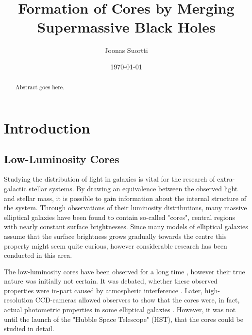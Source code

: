 \documentclass[english, twoside]{HYgradu}
\title{Formation of Cores by Merging Supermassive Black Holes}
\author{Joonas Suortti}
\date{\today}
\begin{document}
\maketitle

\onehalfspacing

\begin{abstract}
Abstract goes here.
\end{abstract}

\mytableofcontents



\chapter{Introduction}

\section{Low-Luminosity Cores}

Studying the distribution of light in galaxies is vital for the research of extra-galactic stellar systems. By drawing an equivalence between the observed light and stellar mass, it is possible to gain information about the internal structure of the system. Through observations of their luminosity distributions, many massive elliptical galaxies have been found to contain so-called "cores", central regions with nearly constant surface brightnesses. Since many models of elliptical galaxies assume that the surface brightness grows gradually towards the centre \citep[e.g.][]{deVaucouleurs1948, Sersic1968} this property might seem quite curious, however considerable research has been conducted in this area.

The low-luminosity cores have been observed for a long time \citep[e.g.][]{King1966}, however their true nature was initially not certain. It was debated, whether these observed properties were in-part caused by atmospheric interference \citep{King1978, Schweizer1979}. Later, high-resolution CCD-cameras allowed observers to show that the cores were, in fact, actual photometric properties in some elliptical galaxies \citep{Lauer1985, Kormendy1985}. However, it was not until the launch of the "Hubble Space Telescope" (HST), that the cores could be studied in detail.
\end{document}
